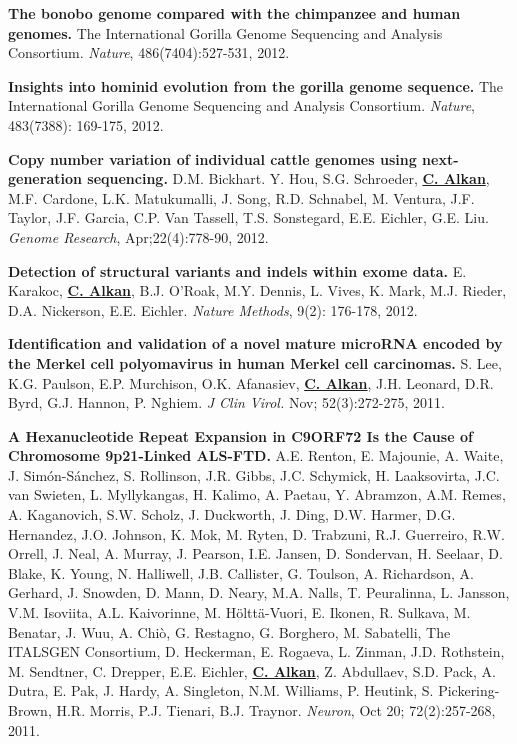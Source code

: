  \vspace{-.2cm}
        {\bf The bonobo genome compared with the chimpanzee and human genomes.}
        The International Gorilla Genome Sequencing and Analysis Consortium.
        {\em Nature}, 486(7404):527-531, 2012.


\vspace{-.2cm}
{\bf Insights into hominid evolution from the gorilla genome sequence.}
The International Gorilla Genome Sequencing and Analysis Consortium.
{\em Nature}, 483(7388): 169-175, 2012. 

\vspace{-.2cm}
{\bf Copy number variation of individual cattle genomes using next-generation sequencing.} 
D.M. Bickhart. Y. Hou, S.G. Schroeder, {\bf {\underline {C. Alkan}}}, M.F. Cardone, L.K. Matukumalli, J. Song, 
R.D. Schnabel, M. Ventura, J.F. Taylor, J.F. Garcia, C.P. Van Tassell, T.S. Sonstegard, E.E. Eichler, G.E. Liu. 
{\em Genome Research}, Apr;22(4):778-90, 2012.

\vspace{-.2cm}
{\bf Detection of structural variants and indels within exome data.} E. Karakoc, {\bf {\underline {C. Alkan}}}, B.J. O'Roak, 
M.Y. Dennis, L. Vives, K. Mark, M.J. Rieder, D.A. Nickerson, E.E. Eichler. {\em Nature Methods}, 9(2): 176-178, 2012.


\vspace{-.2cm}
{\bf Identification and validation of a novel mature microRNA encoded by the Merkel cell polyomavirus in human Merkel cell carcinomas.}
S. Lee, K.G. Paulson, E.P. Murchison, O.K. Afanasiev, {\bf {\underline {C. Alkan}}}, J.H. Leonard, D.R. Byrd, G.J. Hannon, 
P. Nghiem. {\em J Clin Virol.} Nov; 52(3):272-275, 2011. 


\vspace{-.2cm}
{\bf A Hexanucleotide Repeat Expansion in C9ORF72 Is the Cause of Chromosome 9p21-Linked ALS-FTD.}  
A.E. Renton, E. Majounie, A. Waite, J. Simón-Sánchez, S. Rollinson, J.R. Gibbs, J.C. Schymick, H. Laaksovirta, J.C. van Swieten, L. Myllykangas, 
H. Kalimo, A. Paetau, Y. Abramzon, A.M. Remes, A. Kaganovich, S.W. Scholz, J. Duckworth, J. Ding, D.W. Harmer, D.G. Hernandez, J.O. Johnson, 
K. Mok, M. Ryten, D. Trabzuni, R.J. Guerreiro, R.W. Orrell, J. Neal, A. Murray, J. Pearson, I.E. Jansen, D. Sondervan, H. Seelaar, D. Blake, 
K. Young, N. Halliwell, J.B. Callister, G. Toulson, A. Richardson, A. Gerhard, J. Snowden, D. Mann, D. Neary, M.A. Nalls, T. Peuralinna, 
L. Jansson, V.M. Isoviita, A.L. Kaivorinne, M. Hölttä-Vuori, E. Ikonen, R. Sulkava, M. Benatar, J. Wuu, A. Chiò, G. Restagno, 
G. Borghero, M. Sabatelli, The ITALSGEN Consortium, D. Heckerman, E. Rogaeva, L. Zinman, J.D. Rothstein, M. Sendtner, C. Drepper, E.E. Eichler, 
{\bf {\underline {C. Alkan}}}, Z. Abdullaev, S.D. Pack, A. Dutra, E. Pak, J. Hardy, A. Singleton, N.M. Williams, P. Heutink, S. Pickering-Brown, 
H.R. Morris, P.J. Tienari, B.J. Traynor. {\em Neuron}, Oct 20; 72(2):257-268, 2011.

